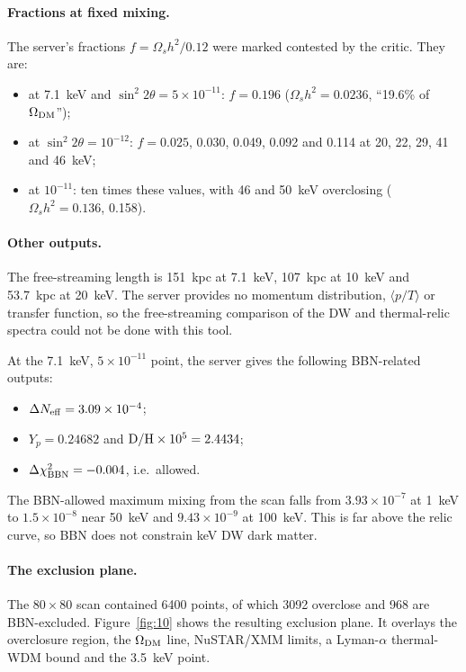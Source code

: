 \documentclass[11pt,a4paper]{article}
\begin{document}
\paragraph{Fractions at fixed mixing.} The server's fractions $f=\Omega_s h^2/0.12$ were marked contested by the critic. They are:
\begin{itemize}
\item at 7.1~keV and $\sin^2 2\theta=5\times10^{-11}$: $f=0.196$ ($\Omega_s h^2=0.0236$, ``19.6\% of $\Omega_{\rm DM}$'');
\item at $\sin^2 2\theta=10^{-12}$: $f=0.025$, 0.030, 0.049, 0.092 and 0.114 at 20, 22, 29, 41 and 46~keV;
\item at $10^{-11}$: ten times these values, with 46 and 50~keV overclosing ($\Omega_s h^2=0.136$, 0.158).
\end{itemize}

\paragraph{Other outputs.} The free-streaming length is 151~kpc at 7.1~keV, 107~kpc at 10~keV and 53.7~kpc at 20~keV. The server provides no momentum distribution, $\langle p/T\rangle$ or transfer function, so the free-streaming comparison of the DW and thermal-relic spectra could not be done with this tool.

At the 7.1~keV, $5\times10^{-11}$ point, the server gives the following BBN-related outputs:
\begin{itemize}
\item $\Delta N_{\rm eff}=3.09\times10^{-4}$;
\item $Y_p=0.24682$ and ${\rm D/H}\times10^5=2.4434$;
\item $\Delta\chi^2_{\rm BBN}=-0.004$, i.e.\ allowed.
\end{itemize}

The BBN-allowed maximum mixing from the scan falls from $3.93\times10^{-7}$ at 1~keV to $1.5\times10^{-8}$ near 50~keV and $9.43\times10^{-9}$ at 100~keV. This is far above the relic curve, so BBN does not constrain keV DW dark matter.

\paragraph{The exclusion plane.} The $80\times80$ scan contained 6400 points, of which 3092 overclose and 968 are BBN-excluded. Figure~\ref{fig:10} shows the resulting exclusion plane. It overlays the overclosure region, the $\Omega_{\rm DM}$ line, NuSTAR/XMM limits, a Lyman-$\alpha$ thermal-WDM bound and the 3.5~keV point.
\end{document}
